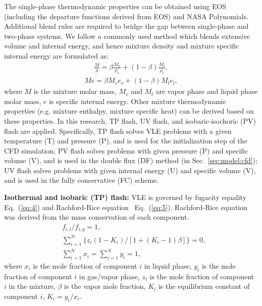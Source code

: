 The single-phase thermodynamic properties can be obtained using EOS (including the departure functions derived from EOS) and NASA Polynomials. Additional blend rules are required to bridge the gap between single-phase and two-phase systems. We follow a commonly used method which blends \cite{matheis2018multi,tudisco2020numerical} extensive volume and internal energy, and hence mixture density and mixture specific internal energy are formulated as:
\begin{align} \frac{M}{\rho} = \beta \frac{M_v}{\rho_v}+\left(1-\beta\right)\frac{M_l}{\rho_l}, \label{eq:rho}
\end{align}
\begin{align} Me = \beta M_v e_v + \left(1-\beta\right)M_l e_l, \label{eq:e}
\end{align}
where $M$ is the mixture molar mass, $M_v$ and $M_l$ are vapor phase and liquid phase molar mass, $e$ is specific internal energy. 
Other mixture thermodynamic properties (e.g. mixture enthalpy, mixture specific heat) can be derived based on these properties. 
In this research, TP flash, UV flash, and isobaric-isochoric (PV) flash are applied. Specifically, 
TP flash solves VLE problems with a given temperature (T) and pressure (P), and is used for the initialization step of the CFD simulation; PV flash solves problems with given pressure (P) and specific volume (V), and is used in the double flux (DF) method (in Sec.~\ref{sec:model:cfd}); UV flash solves problems with given internal energy (U) and specific volume (V), and is used in the fully conservative (FC) scheme. 

\textbf{Isothermal and isobaric (TP) flash:}
VLE is governed by fugacity equality Eq.~(\ref{eq:4}) and Rachford-Rice equation~\cite{rachford1952procedure} Eq.~(\ref{eq:5}). Rachford-Rice equation was derived from the mass conservation of each component.
\begin{align}
&f_{i, l}\big/f_{i, g}=1,  \label{eq:4} \\
&\sum_{i=1}^{N}\bigg\{z_i\left(1-K_i\right)\bigg/\left[1+\left(K_i-1\right)\beta\right]\bigg\}=0, \label{eq:5} \\
&\sum_{i=1}^{N}x_i=\sum_{i=1}^{N}y_i=1,  \label{eq:5-2}
\end{align}
where $x_i$ is the mole fraction of component $i$ in liquid phase, $y_i$ is the mole fraction of component $i$ in gas/vapor phase, $z_i$ is the mole fraction of component $i$ in the mixture, $\beta$ is the vapor mole fraction, $K_i$ is the equilibrium constant of component $i$, $K_i=y_i/x_i$. %

